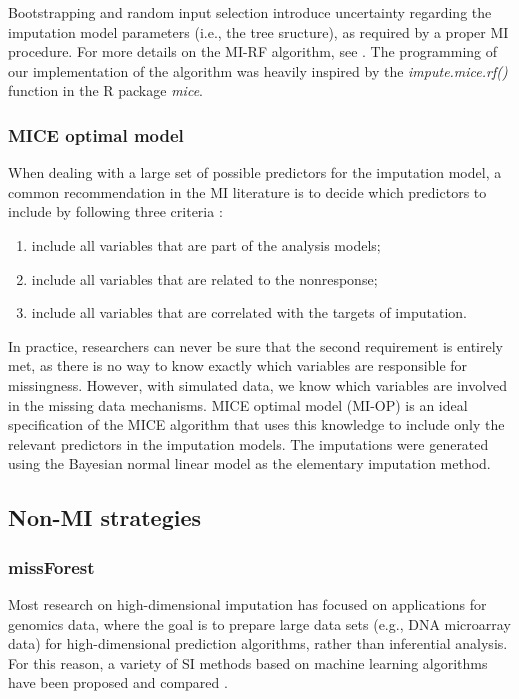 	Bootstrapping and random input selection introduce uncertainty regarding the imputation model parameters (i.e., the tree sructure),
	as required by a proper MI procedure.
	For more details on the MI-RF algorithm, see \citet[][algorithm A.1, p. 103]{dooveEtAl:2014}.
	The programming of our implementation of the algorithm was heavily inspired by the \emph{impute.mice.rf()} function in the 
	R package \emph{mice}.

\subsubsection{MICE optimal model}
	When dealing with a large set of possible predictors for the imputation model, a common recommendation in the MI 
	literature is to decide which predictors to include by following three criteria \citep[p. 168]{vanBuuren:2018}:
	\begin{enumerate}

	\item include all variables that are part of the analysis models;
	\item include all variables that are related to the nonresponse;
	\item include all variables that are correlated with the targets of imputation.

	\end{enumerate}

	In practice, researchers can never be sure that the second requirement is entirely met, as there is no way to know exactly 
	which variables are responsible for missingness.
	However, with simulated data, we know which variables are involved in the missing data mechanisms.
	MICE optimal model (MI-OP) is an ideal specification of the MICE algorithm that uses this knowledge to include only the relevant predictors in the imputation models. The imputations were generated using the Bayesian normal linear model as the elementary imputation method.
	
\subsection{Non-MI strategies}

\subsubsection{missForest}
	Most research on high-dimensional imputation has focused on applications for genomics data, where the goal is to prepare large data sets (e.g., DNA microarray data) for high-dimensional
	prediction algorithms, rather than inferential analysis.
	For this reason, a variety of SI methods based on machine learning algorithms have been proposed
	and compared \citep[e.g.,][]{deAndradeSilvaHruschka:2009, stekhovenBuhlmann:2011}.

